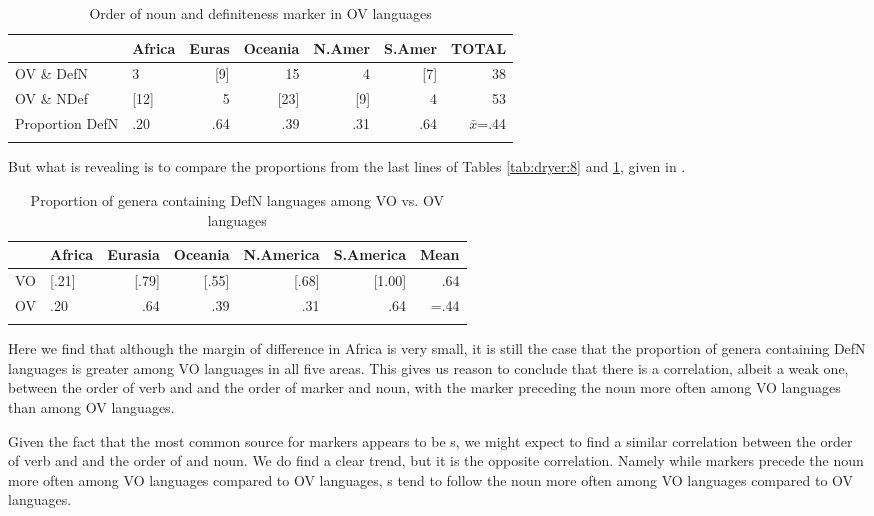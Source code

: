 \documentclass[output=paper]{langsci/langscibook}
\begin{document}
\begin{table}
\begin{tabularx}{\textwidth}{llrrrrr} 
\lsptoprule
& \bfseries Africa & \bfseries Euras & \bfseries Oceania & \bfseries N.Amer & \bfseries S.Amer & \bfseries TOTAL\\
\midrule
OV \& DefN & 3 & [9] & 15 & 4 & [7] & 38\\
OV \& NDef & [12] & 5 & [23] & [9] & 4 & 53\\
Proportion DefN & .20 & .64 & .39 & .31 & .64 & $\bar{x}$=.44\\
\lspbottomrule
\end{tabularx} 
\caption{Order of noun and definiteness marker in OV languages}
\label{tab:dryer:9}
\end{table}

But what is revealing is to compare the proportions from the last lines of Tables \ref{tab:dryer:8} and \ref{tab:dryer:9}, given in .

\begin{table}
\begin{tabularx}{\textwidth}{Xlrrrrr} 
\lsptoprule
& \bfseries Africa & \bfseries Eurasia & \bfseries Oceania & \bfseries N.America & \bfseries S.America & \bfseries Mean\\
\midrule 
VO & [.21] & [.79] & [.55] & [.68] & [1.00] & .64\\
OV & .20 & .64 & .39 & .31 & .64 & =.44\\
\lspbottomrule
\end{tabularx} 
\caption{\label{tab:dryer:10} Proportion of genera containing DefN languages among VO vs. OV languages}
\end{table}

\noindent Here we find that although the margin of difference in Africa is very small, it is still the case that the proportion of genera containing DefN languages is greater among VO languages in all five areas. This gives us reason to conclude that there is a correlation, albeit a weak one, between the order of verb and  and the order of  marker and noun, with the  marker preceding the noun more often among VO languages than among OV languages.

Given the fact that the most common  source for  markers appears to be s, we might expect to find a similar correlation between the order of verb and  and the order of  and noun. We do find a clear trend, but it is the opposite correlation. Namely while  markers precede the noun more often among VO languages compared to OV languages, s tend to follow the noun more often among VO languages compared to OV languages.
\end{document}
